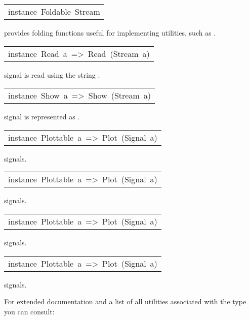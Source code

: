 \begin{haddockdesc}
\item[\begin{tabular}{@{}l}
instance\ Foldable\ Stream
\end{tabular}]\haddockbegindoc
provides folding functions useful for implementing utilities, such as .\par


\item[\begin{tabular}{@{}l}
instance\ Read\ a\ =>\ Read\ (Stream\ a)
\end{tabular}]\haddockbegindoc
signal  is read using the string .\par


\item[\begin{tabular}{@{}l}
instance\ Show\ a\ =>\ Show\ (Stream\ a)
\end{tabular}]\haddockbegindoc
signal  is represented as .\par


\item[\begin{tabular}{@{}l}
instance\ Plottable\ a\ =>\ Plot\ (Signal\ a)
\end{tabular}]\haddockbegindoc
{} signals.\par


\item[\begin{tabular}{@{}l}
instance\ Plottable\ a\ =>\ Plot\ (Signal\ a)
\end{tabular}]\haddockbegindoc
{} signals.\par


\item[\begin{tabular}{@{}l}
instance\ Plottable\ a\ =>\ Plot\ (Signal\ a)
\end{tabular}]\haddockbegindoc
{} signals.\par


\item[\begin{tabular}{@{}l}
instance\ Plottable\ a\ =>\ Plot\ (Signal\ a)
\end{tabular}]\haddockbegindoc
{} signals.\par

\end{haddockdesc}
For extended documentation and a list of all utilities associated
 with the  type you can consult:\par

